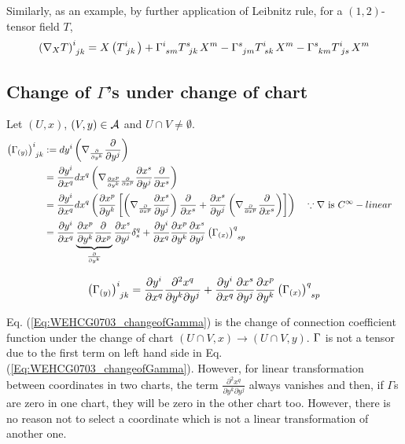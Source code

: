 Similarly, as an example, by further application of Leibnitz rule, for a $(1,2)$-tensor field $T$,
\begin{align*}
  \left(\nabla_X T\right)\indices{^i_{jk}} = X\left(T\indices{^i_{jk}}\right) + \ccf{i}{sm} T\indices{^s_{jk}} X^m - \ccf{s}{jm} T\indices{^i_{sk}} X^m - \ccf{s}{km} T\indices{^i_{js}} X^m
\end{align*}


\subsection{Change of $\Gamma$'s under change of chart}
Let $(U,x)$, $(V,y) \in \mathcal{A}$ and $U \cap V \neq \emptyset$.
\begin{align*}
\ccfx{i}{jk}{(y)} & := dy^i \left(\nabla_{\cibasis{y^k}} \cibasis{y^j} \right) \\
& = \cibasis[y^i]{x^q} dx^q \left(\nabla_{\cibasis[x^p]{y^k} \cibasis{x^p}} \cibasis[x^s]{y^j} \cibasis{x^s} \right) \\
& = \cibasis[y^i]{x^q} dx^q \left(\cibasis[x^p]{y^k} \left[ \left(\nabla_{\cibasis{x^p}} \cibasis[x^s]{y^j} \right) \cibasis{x^s} + \cibasis[x^s]{y^j} \left(\nabla_{\cibasis{x^p}} \cibasis{x^s} \right) \right] \right) && \because \nabla \text{ is } C^{\infty}-linear \\
& = \cibasis[y^i]{x^q} \underbrace{\cibasis[x^p]{y^k} \cibasis{x^p}}_{\cibasis{y^k}} \cibasis[x^s]{y^j} \delta^q_s + \cibasis[y^i]{x^q} \cibasis[x^p]{y^k} \cibasis[x^s]{y^j} \ccfx{q}{sp}{(x)}
\end{align*}

\begin{equation}\label{Eq:WEHCG0703_changeofGamma}
\ccfx{i}{jk}{(y)} = \cibasis[y^i]{x^q} \frac{\partial^2 x^q}{\partial y^k \partial y^j} + \cibasis[y^i]{x^q} \cibasis[x^s]{y^j} \cibasis[x^p]{y^k} \ccfx{q}{sp}{(x)}
\end{equation}

Eq. (\ref{Eq:WEHCG0703_changeofGamma}) is the change of connection coefficient function under the change of chart $(U\cap V,x) \to (U\cap V,y)$. $\ccf{}{}$ is not a tensor due to the first term on left hand side in Eq. (\ref{Eq:WEHCG0703_changeofGamma}). However, for linear transformation between coordinates in two charts, the term $\frac{\partial^2 x^q}{\partial y^k \partial y^j}$ always vanishes and then, if $\Gamma$s are zero in one chart, they will be zero in the other chart too. However, there is no reason not to select a coordinate which is not a linear transformation of another one.

